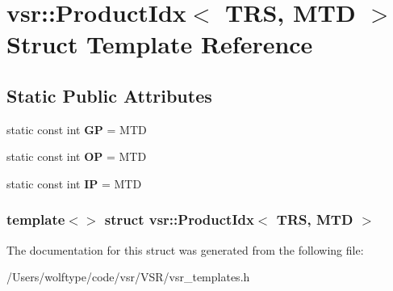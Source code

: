 \hypertarget{structvsr_1_1_product_idx_3_01_t_r_s_00_01_m_t_d_01_4}{\section{vsr\-:\-:Product\-Idx$<$ T\-R\-S, M\-T\-D $>$ Struct Template Reference}
\label{structvsr_1_1_product_idx_3_01_t_r_s_00_01_m_t_d_01_4}
}
\subsection*{Static Public Attributes}
\begin{DoxyCompactItemize}
\item 
\hypertarget{structvsr_1_1_product_idx_3_01_t_r_s_00_01_m_t_d_01_4_a610072e774dc19876cd096e4bac73052}{static const int {\bfseries G\-P} = M\-T\-D}\label{structvsr_1_1_product_idx_3_01_t_r_s_00_01_m_t_d_01_4_a610072e774dc19876cd096e4bac73052}

\item 
\hypertarget{structvsr_1_1_product_idx_3_01_t_r_s_00_01_m_t_d_01_4_ac50ccb3d610d025c7fdbf13074d9dd59}{static const int {\bfseries O\-P} = M\-T\-D}\label{structvsr_1_1_product_idx_3_01_t_r_s_00_01_m_t_d_01_4_ac50ccb3d610d025c7fdbf13074d9dd59}

\item 
\hypertarget{structvsr_1_1_product_idx_3_01_t_r_s_00_01_m_t_d_01_4_af84136747f5fb726c64e7a3cf4fc5687}{static const int {\bfseries I\-P} = M\-T\-D}\label{structvsr_1_1_product_idx_3_01_t_r_s_00_01_m_t_d_01_4_af84136747f5fb726c64e7a3cf4fc5687}

\end{DoxyCompactItemize}
\subsubsection*{template$<$$>$ struct vsr\-::\-Product\-Idx$<$ T\-R\-S, M\-T\-D $>$}



The documentation for this struct was generated from the following file\-:\begin{DoxyCompactItemize}
\item 
/\-Users/wolftype/code/vsr/\-V\-S\-R/vsr\-\_\-templates.\-h\end{DoxyCompactItemize}
